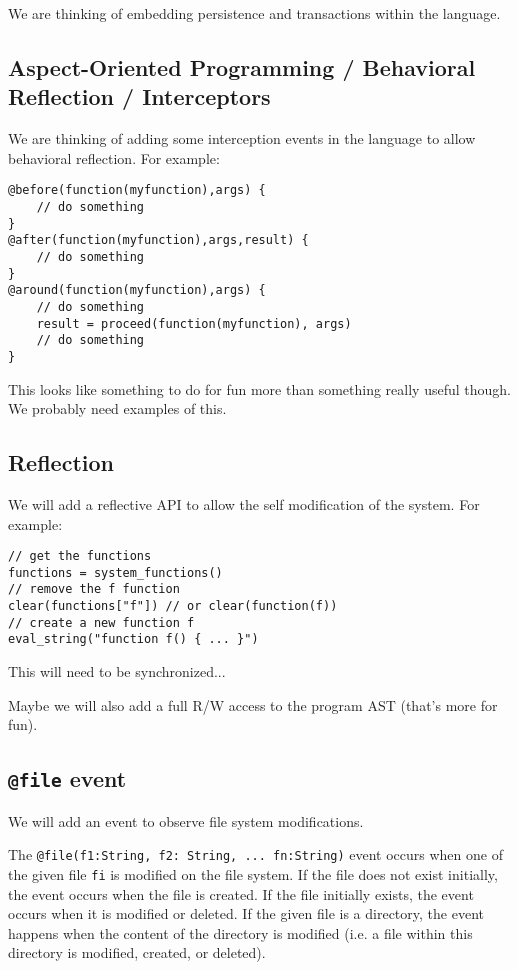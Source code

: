 \documentclass[11pt]{article}
\begin{document}
We are thinking of embedding persistence and transactions within the language.

\subsection{Aspect-Oriented Programming / Behavioral Reflection / Interceptors}

We are thinking of adding some interception events in the language to allow behavioral reflection. For example:

\begin{lstlisting}[numbers=none]
@before(function(myfunction),args) {
	// do something
}
@after(function(myfunction),args,result) {
	// do something
}
@around(function(myfunction),args) {
	// do something
	result = proceed(function(myfunction), args)
	// do something
}
\end{lstlisting}

This looks like something to do for fun more than something really useful though. We probably need examples of this.

\subsection{Reflection}

We will add a reflective API to allow the self modification of the system. For example:

\begin{lstlisting}[numbers=none]
// get the functions
functions = system_functions()
// remove the f function
clear(functions["f"]) // or clear(function(f))
// create a new function f
eval_string("function f() { ... }")
\end{lstlisting}

This will need to be synchronized...

Maybe we will also add a full R/W access to the program AST (that's more for fun).

\subsection{\texttt{@file} event}

We will add an event to observe file system modifications.

The \texttt{@file(f1:String, f2: String, ... fn:String)} event occurs when one of the given file \texttt{fi} is modified on the file system. If the file does not exist initially, the event occurs when the file is created. If the file initially exists, the event occurs when it is modified or deleted. If the given file is a directory, the event happens when the content of the directory is modified (i.e. a file within this directory is modified, created, or deleted).
\end{document}

